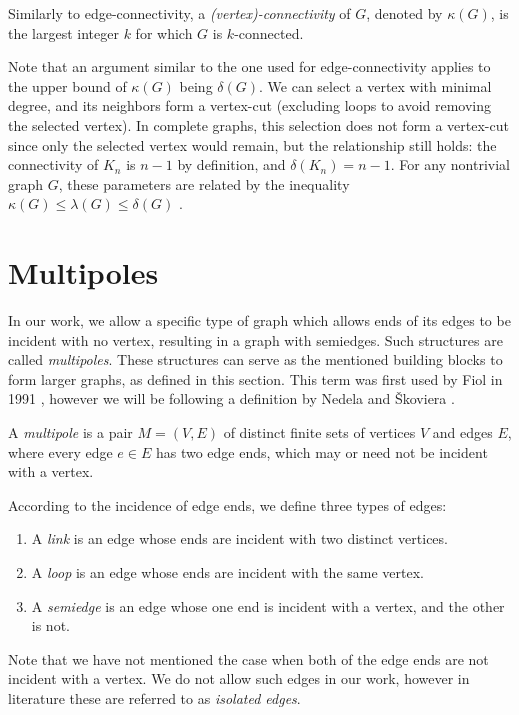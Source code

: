 \documentclass[12pt, twoside]{book}
\begin{document}
Similarly to edge-connectivity, a \textit{(vertex)-connectivity} of $G$, denoted by $\kappa(G)$, is the largest integer $k$ for which $G$ is $k$-connected.

Note that an argument similar to the one used for edge-connectivity applies to the upper bound of $\kappa(G)$ being $\delta(G)$. We can select a vertex with minimal degree, and its neighbors form a vertex-cut (excluding loops to avoid removing the selected vertex). In complete graphs, this selection does not form a vertex-cut since only the selected vertex would remain, but the relationship still holds: the connectivity of $K_n$ is $n-1$ by definition, and $\delta(K_n)=n-1$. For any nontrivial graph $G$, these parameters are related by the inequality $\kappa(G)\leq \lambda(G) \leq \delta(G)$ \cite{Diestel}.

\section{Multipoles}\label{sec:multipoles}

In our work, we allow a specific type of graph which allows ends of its edges to be incident with no vertex, resulting in a graph with semiedges. Such structures are called \textit{multipoles}. These structures can serve as the mentioned building blocks to form larger graphs, as defined in this section. This term was first used by Fiol in 1991 \cite{Fiol1991}, however we will be following a definition by Nedela and Škoviera \cite{Nedela1996}.

\begin{definition}
	A \textit{multipole} is a pair $M=(V,E)$ of distinct finite sets of vertices $V$ and edges $E$, where every edge $e\in E$ has two edge ends, which may or need not be incident with a vertex.
	
	According to the incidence of edge ends, we define three types of edges:
	\begin{enumerate}[nolistsep]
		\item A \textit{link} is an edge whose ends are incident with two distinct vertices.
		\item A \textit{loop} is an edge whose ends are incident with the same vertex.
		\item A \textit{semiedge} is an edge whose one end is incident with a vertex, and the other is not.
	\end{enumerate}
\end{definition}

Note that we have not mentioned the case when both of the edge ends are not incident with a vertex. We do not allow such edges in our work, however in literature these are referred to as \textit{isolated edges}.
\end{document}
